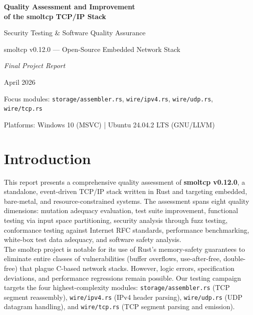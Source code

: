 \documentclass[11pt,a4paper]{article}
\begin{document}
\begin{titlepage}
\centering
\vspace*{2cm}
{\Huge\bfseries\color{sectionblue} Quality Assessment and Improvement\\[0.4cm] of the smoltcp TCP/IP Stack\par}
\vspace{1.5cm}
{\Large Security Testing \& Software Quality Assurance\par}
\vspace{1cm}
{\large smoltcp v0.12.0 --- Open-Source Embedded Network Stack\par}
\vspace{2cm}
{\large\textit{Final Project Report}\par}
\vspace{0.5cm}
{\large April 2026\par}
\vfill
{\small Focus modules: \texttt{storage/assembler.rs}, \texttt{wire/ipv4.rs}, \texttt{wire/udp.rs}, \texttt{wire/tcp.rs}\par}
{\small Platforms: Windows 10 (MSVC) | Ubuntu 24.04.2 LTS (GNU/LLVM)\par}
\end{titlepage}

\tableofcontents
\newpage

\section{Introduction}

This report presents a comprehensive quality assessment of \textbf{smoltcp v0.12.0}, a standalone, event-driven TCP/IP stack written in Rust and targeting embedded, bare-metal, and resource-constrained systems. The assessment spans eight quality dimensions: mutation adequacy evaluation, test suite improvement, functional testing via input space partitioning, security analysis through fuzz testing, conformance testing against Internet RFC standards, performance benchmarking, white-box test data adequacy, and software safety analysis.\\

The smoltcp project is notable for its use of Rust's memory-safety guarantees to eliminate entire classes of vulnerabilities (buffer overflows, use-after-free, double-free) that plague C-based network stacks. However, logic errors, specification deviations, and performance regressions remain possible. Our testing campaign targets the four highest-complexity modules: \texttt{storage/assembler.rs} (TCP segment reassembly), \texttt{wire/ipv4.rs} (IPv4 header parsing), \texttt{wire/udp.rs} (UDP datagram handling), and \texttt{wire/tcp.rs} (TCP segment parsing and emission).\\
\end{document}
